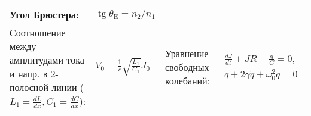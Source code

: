 \documentclass{article}
\begin{document}
\begin{tabular}{ |p{5cm}|p{4.5cm}|p{6cm}|p{3.5cm}|  }
Угол Брюстера:                                                             &
$\operatorname{tg} \theta_{\mathrm{E}}=n_{2} / n_{1}$                      \\
\hline
Соотношение между амплитудами тока и напр. в 2-полосной линии ($L_1 = \frac{d{L}}{d{x}}, C_1 = \frac{d{C}}{d{x}}$): &
$V_{0}=\frac{1}{c} \sqrt{\frac{L_{1}}{C_{1}}} J_{0}$                       &
Уравнение свободных колебаний:                                             &
$\begin{aligned}
 \frac{d J}{d t}+J R+\frac{q}{C}=0,\\
\ddot{q}+2 \gamma \dot{q}+\omega_{0}^{2} q=0
\end{aligned}$                                                             \\
\hline
\end{tabular}

\newpage
\end{document}
